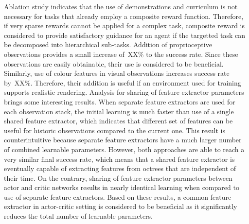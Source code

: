 Ablation study indicates that the use of demonstrations and curriculum is not necessary for tasks that already employ a composite reward function. Therefore, if very sparse rewards cannot be applied for a complex task, composite reward is considered to provide satisfactory guidance for an agent if the targetted task can be decomposed into hierarchical sub-tasks. Addition of proprioceptive observations provides a small increase of~XX\% to the success rate. Since these observations are easily obtainable, their use is considered to be beneficial. Similarly, use of colour features in visual observations increases success rate by~XX\%. Therefore, their addition is useful if an environment used for training supports realistic rendering. Analysis for sharing of feature extractor parameters brings some interesting results. When separate feature extractors are used for each observation stack, the initial learning is much faster than use of a single shared feature extractor, which indicates that different set of features can be useful for historic observations compared to the current one. This result is counterintuitive because separate feature extractors have a much larger number of combined learnable parameters. However, both approaches are able to reach a very similar final success rate, which means that a shared feature extractor is eventually capable of extracting features from octrees that are independent of their time. On the contrary, sharing of feature extractor parameters between actor and critic networks results in nearly identical learning when compared to use of separate feature extractors. Based on these results, a common feature extractor in actor-critic setting is considered to be beneficial as it significantly reduces the total number of learnable parameters.

